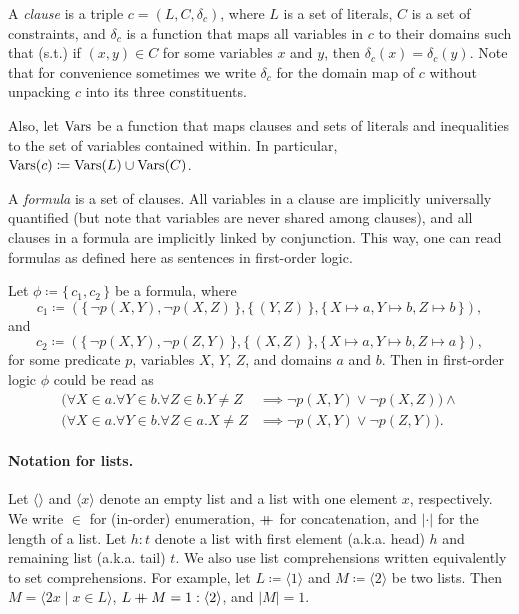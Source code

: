 \begin{definition}
  A \emph{clause} is a triple $c = (L, C, \delta_c)$, where $L$ is a set of literals, $C$ is a set of constraints, and $\delta_c$ is a function that maps all variables in $c$ to their domains such that (s.t.) if $(x, y) \in C$ for some variables $x$ and $y$, then $\delta_c(x) = \delta_c(y)$. Note that for convenience sometimes we write $\delta_c$ for the domain map of $c$ without unpacking $c$ into its three constituents.

  Also, let $\operatorname{Vars}$ be a function that maps clauses and sets of literals and inequalities to the set of variables contained within. In particular, $\operatorname{Vars}(c) \coloneqq \operatorname{Vars}(L) \cup \operatorname{Vars}(C)$.
\end{definition}

A \emph{formula} is a set of clauses. All variables in a clause are implicitly universally quantified (but note that variables are never shared among clauses), and all clauses in a formula are implicitly linked by conjunction. This way, one can read formulas as defined here as sentences in first-order logic.

\begin{example} \label{example:first}
  Let $\phi \coloneqq \{\, c_1, c_2 \,\}$ be a formula, where
  \[
    c_1 \coloneqq (\{\, \neg p(X, Y), \neg p(X, Z) \,\}, \{\, (Y, Z) \,\}, \{\, X \mapsto a, Y \mapsto b, Z \mapsto b \,\}),
  \]
  and
  \[
    c_2 \coloneqq (\{\, \neg p(X, Y), \neg p(Z, Y) \,\}, \{\, (X, Z) \,\}, \{\, X \mapsto a, Y \mapsto b, Z \mapsto a \,\}),
  \]
  for some predicate $p$, variables $X$, $Y$, $Z$, and domains $a$ and $b$. Then in first-order logic $\phi$ could be read as
  \begin{align*}
    (\forall X \in a. \forall Y \in b. \forall Z \in b. Y \ne Z &\implies \neg p(X, Y) \lor \neg p(X, Z)) \land \\
    (\forall X \in a. \forall Y \in b. \forall Z \in a. X \ne Z &\implies \neg p(X, Y) \lor \neg p(Z, Y)).
  \end{align*}
\end{example}

\paragraph{Notation for lists.}
Let $\langle\rangle$ and $\langle x \rangle$ denote an empty list and a list with one element $x$, respectively. We write $\in$ for (in-order) enumeration, $\mathbin{+\mkern-10mu+}$ for concatenation, and $|\cdot|$ for the length of a list. Let $h : t$ denote a list with first element (a.k.a. head) $h$ and remaining list (a.k.a. tail) $t$. We also use list comprehensions written equivalently to set comprehensions. For example, let $L \coloneqq \langle 1 \rangle$ and $M \coloneqq \langle 2 \rangle$ be two lists. Then $M = \langle 2x \mid x \in L \rangle$, $L \mathbin{+\mkern-10mu+} M = 1 : \langle 2 \rangle$, and $|M| = 1$.


